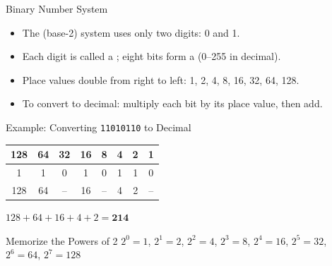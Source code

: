 \documentclass[aspectratio=169]{beamer}  %
\begin{document}
\begin{frame}{Binary Number System}
    \begin{itemize}
        \item The  (base-2) system uses only two digits: 0 and 1.
        \item Each digit is called a ; eight bits form a  (0--255 in decimal).
        \item Place values double from right to left: 1, 2, 4, 8, 16, 32, 64, 128.
        \item To convert to decimal: multiply each bit by its place value, then add.
    \end{itemize}
    
    \begin{exampleblock}{Example: Converting \texttt{11010110} to Decimal}
        \centering
        \begin{tabular}{c|c|c|c|c|c|c|c}
            128 & 64 & 32 & 16 & 8 & 4 & 2 & 1 \\
            \hline
            1 & 1 & 0 & 1 & 0 & 1 & 1 & 0 \\
            \hline
            128 & 64 & -- & 16 & -- & 4 & 2 & -- \\
        \end{tabular}
        
        \vspace{0.3em}
        $128 + 64 + 16 + 4 + 2 = \mathbf{214}$
    \end{exampleblock}
    
    \begin{alertblock}{Memorize the Powers of 2}
        $2^0=1$, $2^1=2$, $2^2=4$, $2^3=8$, $2^4=16$, $2^5=32$, $2^6=64$, $2^7=128$
    \end{alertblock}
\end{frame}
\end{document}

